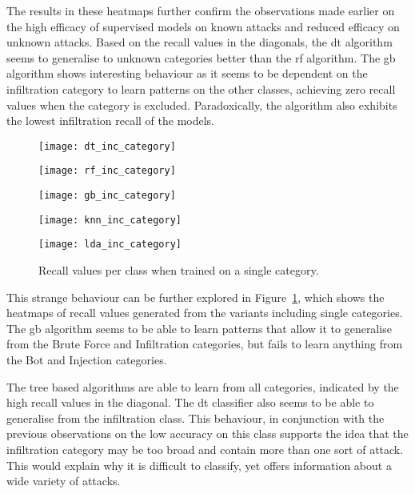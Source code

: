 The results in these heatmaps further confirm the observations made earlier on
the high efficacy of supervised models on known attacks and reduced efficacy on
unknown attacks. Based on the recall values in the diagonals, the \gls{dt}
algorithm seems to generalise to unknown categories better than the \gls{rf}
algorithm. The \gls{gb} algorithm shows interesting behaviour as it seems to be
dependent on the infiltration category to learn patterns on the other classes,
achieving zero recall values when the category is excluded. Paradoxically, the
algorithm also exhibits the lowest infiltration recall of the models.
%
\begin{figure}[htbp]
    \centering
    \begin{minipage}[h]{0.5\textwidth}
        \centering
        \texttt{[image: dt\_inc\_category]}
    \end{minipage}\hfill
    \begin{minipage}[h]{0.5\textwidth}
        \centering
        \texttt{[image: rf\_inc\_category]}
    \end{minipage}
    \begin{minipage}[h]{0.5\textwidth}
        \centering
        \texttt{[image: gb\_inc\_category]}
    \end{minipage}\hfill
    \begin{minipage}[h]{0.5\textwidth}
        \centering
        \texttt{[image: knn\_inc\_category]}
    \end{minipage}
    \begin{minipage}[h]{0.5\textwidth}
        \centering
        \texttt{[image: lda\_inc\_category]}
    \end{minipage}
    \caption[Single Category Results]{Recall values per class when trained on a single category.\label{fig:inc_cat}}
\end{figure}
% 
This strange behaviour can be further explored in Figure~\ref{fig:inc_cat},
which shows the heatmaps of recall values generated from the variants including
single categories. The \gls{gb} algorithm seems to be able to learn patterns
that allow it to generalise from the Brute Force and Infiltration categories,
but fails to learn anything from the Bot and Injection categories.

The tree based algorithms are able to learn from all categories, indicated by
the high recall values in the diagonal. The \gls{dt} classifier also seems to
be able to generalise from the infiltration class. This behaviour, in
conjunction with the previous observations on the low accuracy on this class
supports the idea that the infiltration category may be too broad and contain
more than one sort of attack. This would explain why it is difficult to
classify, yet offers information about a wide variety of attacks.

